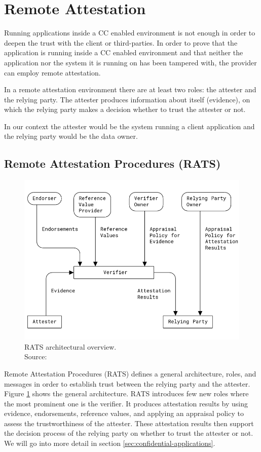 \section{Remote Attestation}
\label{ch:remote-attestation}

Running applications inside a CC enabled environment is not enough in order to
deepen the trust with the client or third-parties. In order to prove that the
application is running inside a CC enabled environment and that neither the
application nor the system it is running on has been tampered with, the provider
can employ remote attestation.

In a remote attestation environment there are at least two roles: the attester
and the relying party. The attester produces information about itself
(evidence), on which the relying party makes a decision whether to trust the
attester or not.

In our context the attester would be the system running a client application and
the relying party would be the data owner.

\subsection{Remote Attestation Procedures (RATS)}
\label{sec:rats}

\begin{figure}
  \centering
  \includegraphics[width=0.8\linewidth]{resources/rats-architecture.png}
  \caption[RATS architectural overview]{
    RATS architectural overview.\\
    Source:  \cite{rfc9334}
  }
  \label{figure:rats-architecture}
\end{figure}

Remote Attestation Procedures (RATS) defines a general architecture, roles, and
messages in order to establish trust between the relying party and the attester.
Figure \ref{figure:rats-architecture} shows the general architecture. RATS
introduces few new roles where the most prominent one is the verifier. It
produces attestation results by using evidence, endorsements, reference values,
and applying an appraisal policy to assess the trustworthiness of the attester.
These attestation results then support the decision process of the relying party
on whether to trust the attester or not. We will go into more detail in section
\ref{sec:confidential-applications}.
